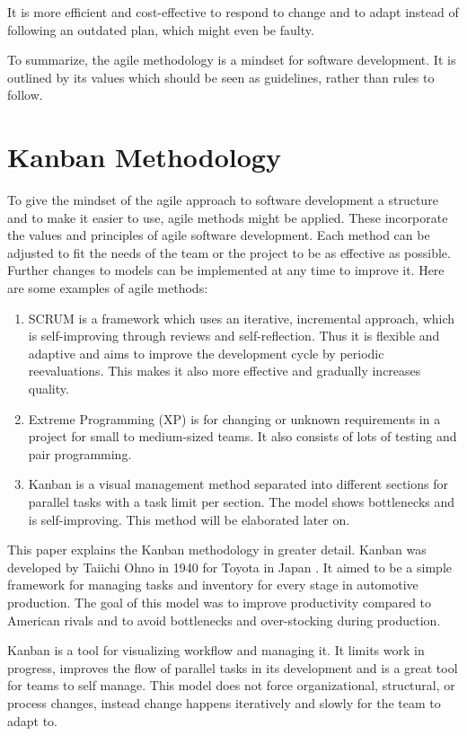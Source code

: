 \documentclass[runningheads]{llncs}
\begin{document}
It is more efficient and cost-effective to respond to change and to adapt instead of following an outdated plan, which might even be faulty.

To summarize, the agile methodology is a mindset for software development. It is outlined by its values\cite{ref_agilemanifesto}
which should be seen as guidelines, rather than rules to follow.

\section{Kanban Methodology}
To give the mindset of the agile approach to software development a structure and to make it easier to use, agile methods might 
be applied. These incorporate the values and principles of agile software development. Each method can be adjusted to fit the 
needs of the team or the project to be as effective as possible. 
Further changes to models can be implemented at any time to improve it. Here are some examples of agile methods:

\begin{enumerate}
  \item SCRUM is a framework which uses an iterative, incremental approach, which is self-improving through reviews and self-reflection. 
  Thus it is flexible and adaptive and aims to improve the development cycle by periodic reevaluations. This makes it also more 
  effective and gradually increases quality.
  \item Extreme Programming (XP) is for changing or unknown requirements in a project for small to medium-sized teams. It also consists
  of lots of testing and pair programming.
  \item Kanban is a visual management method separated into different sections for parallel tasks with a task limit per section. The model 
  shows bottlenecks and is self-improving. This method will be elaborated later on.
\end{enumerate}

This paper explains the Kanban methodology in greater detail. Kanban was developed by Taiichi Ohno in 1940 for Toyota in Japan \cite{ref_kanban}. 
It aimed to be a simple framework for managing tasks and inventory for every stage in automotive production. The goal of this model 
was to improve productivity compared to American rivals and to avoid bottlenecks and over-stocking during production. 

Kanban is a tool for visualizing workflow and managing it. It limits work in progress, improves the flow of parallel tasks in its development 
and is a great tool for teams to self manage. This model does not force organizational, structural, or process changes, instead change happens 
iteratively and slowly for the team to adapt to.
\end{document}
